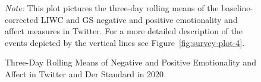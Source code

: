 \documentclass[
  english,
  jou,floatsintext]{apa7}
\begin{document}
\begin{figure}
\caption{Three-Day Rolling Means of Negative and Positive Emotionality and Affect in Twitter and Der Standard in 2020  \label{fig:survey-plot-3}}

\newline{}

\textit{Note:} This plot pictures the three-day rolling means of the baseline-corrected LIWC and GS negative and positive emotionality and affect measures in Twitter. For a more detailed description of the events depicted by the vertical lines see Figure~\ref{fig:survey-plot-4}.   
\end{figure}
\end{document}
